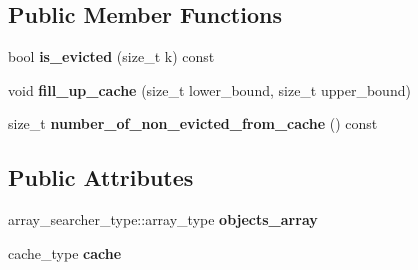 \subsection*{Public Member Functions}
\begin{DoxyCompactItemize}
\item 
\hypertarget{structconcurrency__tests_1_1filled__instance__counting__fixture__with__external__array_a274a059d6c335ca2d9afe2ab5f525e30}{}bool {\bfseries is\+\_\+evicted} (size\+\_\+t k) const \label{structconcurrency__tests_1_1filled__instance__counting__fixture__with__external__array_a274a059d6c335ca2d9afe2ab5f525e30}

\item 
\hypertarget{structconcurrency__tests_1_1filled__instance__counting__fixture__with__external__array_a945f96ffea22a4030c8f46562f60d8c0}{}void {\bfseries fill\+\_\+up\+\_\+cache} (size\+\_\+t lower\+\_\+bound, size\+\_\+t upper\+\_\+bound)\label{structconcurrency__tests_1_1filled__instance__counting__fixture__with__external__array_a945f96ffea22a4030c8f46562f60d8c0}

\item 
\hypertarget{structconcurrency__tests_1_1filled__instance__counting__fixture__with__external__array_aa9b7091bedbbeb88be6e077bb61d2242}{}size\+\_\+t {\bfseries number\+\_\+of\+\_\+non\+\_\+evicted\+\_\+from\+\_\+cache} () const \label{structconcurrency__tests_1_1filled__instance__counting__fixture__with__external__array_aa9b7091bedbbeb88be6e077bb61d2242}

\end{DoxyCompactItemize}
\subsection*{Public Attributes}
\begin{DoxyCompactItemize}
\item 
\hypertarget{structconcurrency__tests_1_1filled__instance__counting__fixture__with__external__array_a0b8ee29aca88332c8f63f9ae2b39a658}{}array\+\_\+searcher\+\_\+type\+::array\+\_\+type {\bfseries objects\+\_\+array}\label{structconcurrency__tests_1_1filled__instance__counting__fixture__with__external__array_a0b8ee29aca88332c8f63f9ae2b39a658}

\item 
\hypertarget{structconcurrency__tests_1_1filled__instance__counting__fixture__with__external__array_af25bc3529f7ceaf24ab3b30e78601400}{}cache\+\_\+type {\bfseries cache}\label{structconcurrency__tests_1_1filled__instance__counting__fixture__with__external__array_af25bc3529f7ceaf24ab3b30e78601400}

\end{DoxyCompactItemize}
